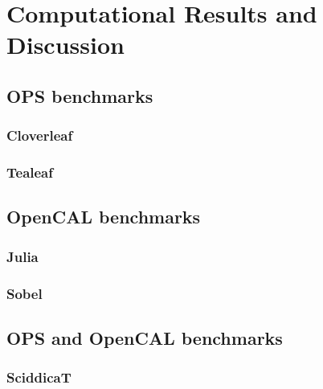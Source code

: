 \chapter{Computational Results and Discussion}

\section{OPS benchmarks}

\subsection{Cloverleaf}

\subsection{Tealeaf}


\section{OpenCAL benchmarks}
\subsection{Julia}

\subsection{Sobel}

\section{OPS and OpenCAL benchmarks}

\subsection{SciddicaT}
